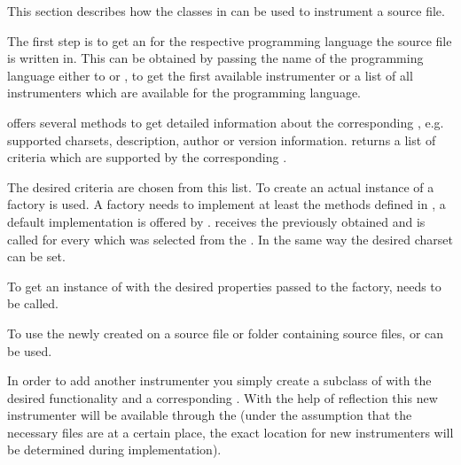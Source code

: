\par This section describes how the classes in  can be used to instrument a source file. \sloppy \par The first step is to get an  for the respective programming language the source file is written in. This  can be obtained by passing the name of the programming language either to  or , to get the first available instrumenter or a list of all instrumenters which are available for the programming language. \fussy \par {} offers several methods to get detailed information about the corresponding , e.g. supported charsets, description, author or version information.  returns a list of criteria which are supported by the corresponding .
\par The desired criteria are chosen from this list. To create an actual instance of  a factory is used. A factory needs to implement at least the methods defined in , a default implementation is offered by .  receives the previously obtained  and  is called for every  which was selected from the . In the same way the desired charset can be set. \par To get an instance of  with the desired properties passed to the factory,  needs to be called. \par To use the newly created  on a source file or folder containing source files,  or  can be used.
\par In order to add another instrumenter you simply create a subclass of  with the desired functionality and a corresponding . With the help of reflection this new instrumenter will be available through the  (under the assumption that the necessary files are at a certain place, the exact location for new instrumenters will be determined during implementation).
